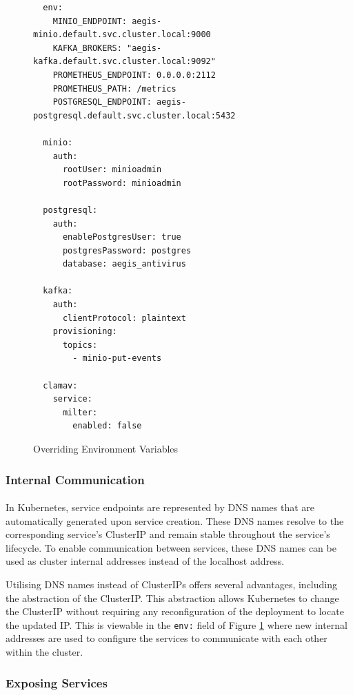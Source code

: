 \documentclass[12pt, conference, final, a4paper, onecolumn, compsoc]{IEEEtran}
\begin{document}
\begin{figure}[H]
\begin{lstlisting}
  env:
    MINIO_ENDPOINT: aegis-minio.default.svc.cluster.local:9000
    KAFKA_BROKERS: "aegis-kafka.default.svc.cluster.local:9092"
    PROMETHEUS_ENDPOINT: 0.0.0.0:2112
    PROMETHEUS_PATH: /metrics
    POSTGRESQL_ENDPOINT: aegis-postgresql.default.svc.cluster.local:5432

  minio:
    auth:
      rootUser: minioadmin
      rootPassword: minioadmin

  postgresql:
    auth:
      enablePostgresUser: true
      postgresPassword: postgres
      database: aegis_antivirus

  kafka:
    auth:
      clientProtocol: plaintext
    provisioning:
      topics:
        - minio-put-events

  clamav:
    service:
      milter:
        enabled: false
\end{lstlisting}
  \caption{Overriding Environment Variables}
  \label{fig:override-env-vars}
\end{figure}

\subsubsection*{Internal Communication}
\paragraph{}

In Kubernetes, service endpoints are represented by DNS names that are
automatically generated upon service creation. These DNS names resolve to the
corresponding service's ClusterIP and remain stable throughout the service's
lifecycle. To enable communication between services, these DNS names can be used
as cluster internal addresses instead of the localhost address.

Utilising DNS names instead of ClusterIPs offers several advantages, including
the abstraction of the ClusterIP. This abstraction allows Kubernetes to change
the ClusterIP without requiring any reconfiguration of the deployment to locate
the updated IP. This is viewable in the \texttt{env:} field of Figure
\ref{fig:override-env-vars} where new internal addresses are used to configure the
services to communicate with each other within the cluster.

\subsubsection*{Exposing Services}
\end{document}
